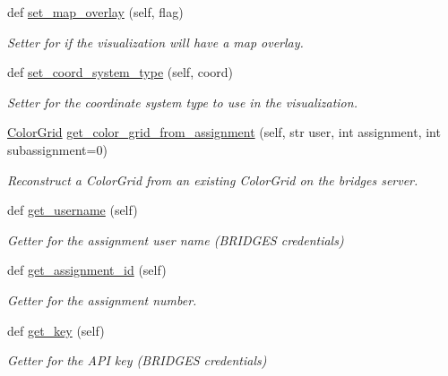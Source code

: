 \begin{DoxyCompactItemize}
def \mbox{\hyperlink{classbridges_1_1bridges_1_1_bridges_ae9ed34b5878d9d120949da0b7e4d2911}{set\+\_\+map\+\_\+overlay}} (self, flag)
\begin{DoxyCompactList}\small\item\em Setter for if the visualization will have a map overlay. \end{DoxyCompactList}\item 
def \mbox{\hyperlink{classbridges_1_1bridges_1_1_bridges_a6bc905490b1995234f88f47af9aa8a17}{set\+\_\+coord\+\_\+system\+\_\+type}} (self, coord)
\begin{DoxyCompactList}\small\item\em Setter for the coordinate system type to use in the visualization. \end{DoxyCompactList}\item 
\mbox{\hyperlink{classbridges_1_1color__grid_1_1_color_grid}{Color\+Grid}} \mbox{\hyperlink{classbridges_1_1bridges_1_1_bridges_a0f809dc3197c139c4e3d178c89b2fa46}{get\+\_\+color\+\_\+grid\+\_\+from\+\_\+assignment}} (self, str user, int assignment, int subassignment=0)
\begin{DoxyCompactList}\small\item\em Reconstruct a Color\+Grid from an existing Color\+Grid on the bridges server. \end{DoxyCompactList}\item 
def \mbox{\hyperlink{classbridges_1_1bridges_1_1_bridges_abf6fdb19db336c2ed14987fdd89d65fe}{get\+\_\+username}} (self)
\begin{DoxyCompactList}\small\item\em Getter for the assignment user name (B\+R\+I\+D\+G\+ES credentials) \end{DoxyCompactList}\item 
def \mbox{\hyperlink{classbridges_1_1bridges_1_1_bridges_a94f39f11368031ad33800aac0bac2f7d}{get\+\_\+assignment\+\_\+id}} (self)
\begin{DoxyCompactList}\small\item\em Getter for the assignment number. \end{DoxyCompactList}\item 
def \mbox{\hyperlink{classbridges_1_1bridges_1_1_bridges_afcdb0291c535b41fb7be31eaf5bf3677}{get\+\_\+key}} (self)
\begin{DoxyCompactList}\small\item\em Getter for the A\+PI key (B\+R\+I\+D\+G\+ES credentials) \end{DoxyCompactList}\end{DoxyCompactItemize}
